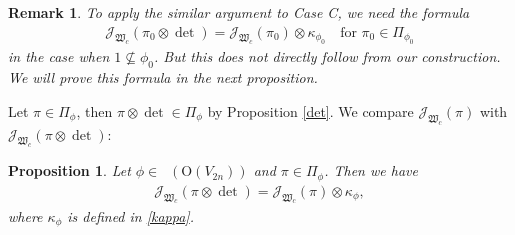 \documentclass[article]{article}
\numberwithin{equation}{section}
\newtheorem{proposition}[theorem]{Proposition}
\newtheorem{remark}[theorem]{Remark}
\theoremstyle{definition}
\DeclareMathOperator{\Para}{\Phi_{temp}}
\begin{document}
\begin{remark}
	To apply the similar argument to Case C, we need the formula 
	\begin{align*}
	\mathcal J_{\mathfrak W_c}(\pi_0\otimes\det)=\mathcal J_{\mathfrak W_c}(\pi_0)\otimes \kappa_{\phi_{0}}\quad \mbox{for}\,\, \pi_{0}\in \Pi_{\phi_0}
	\end{align*}
	in the case when $1\not\subseteq \phi_{0}$. But this does not directly follow from our construction. We will prove this formula in the next proposition.
\end{remark}



Let $\pi\in \Pi_{\phi}$, then $\pi\otimes\det \in \Pi_{\phi}$ by Proposition \ref{det}. We compare $\mathcal J_{\mathfrak W_c}(\pi)$ with $\mathcal J_{\mathfrak W_c}(\pi\otimes\det)$: 
\begin{proposition}\label{determint}
Let  $\phi\in \Para(\mathrm O(V_{2n}))$ and $\pi\in \Pi_{\phi}$. Then we have 
\begin{align*}
\mathcal J_{\mathfrak W_c}(\pi\otimes\det)=\mathcal J_{\mathfrak W_c}(\pi)\otimes\kappa_{\phi},
\end{align*}
where $\kappa_{\phi}$ is defined in \ref{kappa}. 
\end{proposition}
\end{document}
